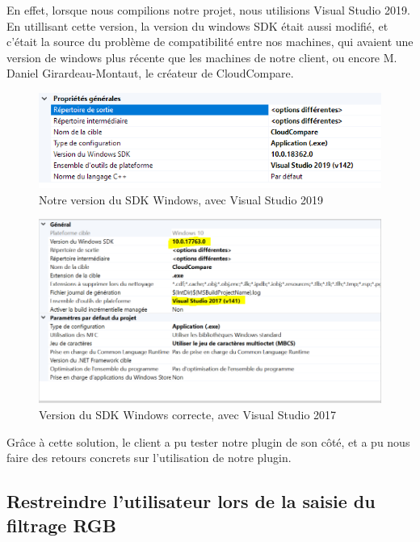 \documentclass[12pt,titlepage,french]{article}
\begin{document}
En effet, lorsque nous compilions notre projet, nous utilisions Visual Studio 2019. En utillisant cette version, la version du windows SDK était aussi modifié, et c'était la source du problème de compatibilité entre nos machines, qui avaient une version de windows plus récente que les machines de notre client, ou encore M. Daniel Girardeau-Montaut, le créateur de CloudCompare.

\begin{figure}[H]
 \caption{\label{} Notre version du SDK Windows, avec Visual Studio 2019}
 \begin{center}
 \includegraphics[width=1\textwidth]{./img/vs2019.PNG}
  \end{center}
\end{figure}


\begin{figure}[H]
 \caption{\label{} Version du SDK Windows correcte, avec Visual Studio 2017}
 \begin{center}
 \includegraphics[width=1\textwidth]{./img/vs2017.PNG}
  \end{center}
\end{figure}

Grâce à cette solution, le client a pu tester notre plugin de son côté, et a pu nous faire des retours concrets sur l'utilisation de notre plugin.

\subsection{Restreindre l'utilisateur lors de la saisie du filtrage RGB}
\end{document}
